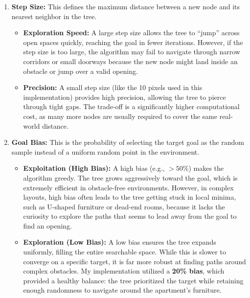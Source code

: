 \documentclass{article}
\begin{document}
\begin{enumerate}
    \item \textbf{Step Size:} This defines the maximum distance between a new node and 
    its nearest neighbor in the tree.
    \begin{itemize}
        \item \textbf{Exploration Speed:} A large step size allows the tree to ``jump'' across 
        open spaces quickly, reaching the goal in fewer iterations. However, if the step size 
        is too large, the algorithm may fail to navigate through narrow corridors or small 
        doorways because the new node might land inside an obstacle or jump over a valid opening.
        \item \textbf{Precision:} A small step size (like the 10 pixels used in this implementation) 
        provides high precision, allowing the tree to pierce through tight gaps. The trade-off 
        is a significantly higher computational cost, as many more nodes are usually required to 
        cover the same real-world distance.
    \end{itemize}

    \item \textbf{Goal Bias:} This is the probability of selecting the target goal as the random 
    sample instead of a uniform random point in the environment.
    \begin{itemize}
        \item \textbf{Exploitation (High Bias):} A high bias (e.g., $>50\%$) makes the algorithm greedy. 
        The tree grows aggressively toward the goal, which is extremely efficient in obstacle-free 
        environments. However, in complex layouts, high bias often leads to the tree getting stuck 
        in local minima, such as U-shaped furniture or dead-end rooms, because it lacks the curiosity 
        to explore the paths that seems to lead away from the goal to find an opening.
        \item \textbf{Exploration (Low Bias):} A low bias ensures the tree expands uniformly, filling 
        the entire searchable space. While this is slower to converge on a specific target, it is far 
        more robust at finding paths around complex obstacles. My implementation utilized a 
        \textbf{20\% bias}, which provided a healthy balance: the tree prioritized the target while 
        retaining enough randomness to navigate around the apartment's furniture.
    \end{itemize}
\end{enumerate}
\end{document}
